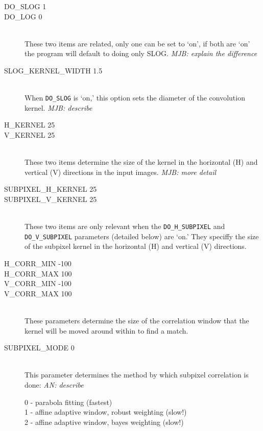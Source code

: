 \begin{description}

\item[DO\_SLOG 1]
\item[DO\_LOG 0] \hfill \\
  These two items are related, only one can be set to `on', if both
  are `on' the program will default to doing only SLOG.  \emph{MJB: explain the difference}
  
\item[SLOG\_KERNEL\_WIDTH 1.5] \hfill \\
  When \texttt{DO\_SLOG} is `on,' this option sets the diameter of
  the convolution kernel. \emph{MJB: describe}

\item[H\_KERNEL 25]
\item[V\_KERNEL 25] \hfill \\
These two items determine the size of the kernel in the horizontal (H) and vertical (V) directions in the input images.  \emph{MJB: more detail}

\item[SUBPIXEL\_H\_KERNEL 25]
\item[SUBPIXEL\_V\_KERNEL 25] \hfill \\
These two items are only relevant when the \texttt{DO\_H\_SUBPIXEL} and \texttt{DO\_V\_SUBPIXEL} parameters (detailed below) are `on.'  They speciffy the size of the subpixel kernel in the horizontal (H) and vertical (V) directions.

\item[H\_CORR\_MIN -100]
\item[H\_CORR\_MAX 100]
\item[V\_CORR\_MIN -100]
\item[V\_CORR\_MAX 100] \hfill \\
These parameters determine the size of the correlation window that the kernel will be moved around within to find a match.

\item[SUBPIXEL\_MODE 0] \hfill \\
This parameter determines the method by which subpixel correlation is done:
\emph{AN: describe}
	\begin{description}
	\item[0 - parabola fitting (fastest)]
	\item[1 - affine adaptive window, robust weighting (slow!)]
	\item[2 - affine adaptive window, bayes weighting (slow!)]
	\end{description}


\end{description}
